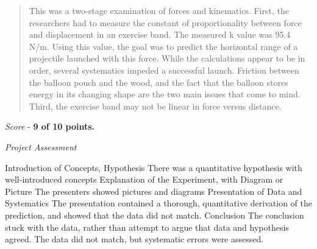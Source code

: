\documentclass[10pt]{article}
\begin{document}
\maketitle

\begin{abstract}
This was a two-stage examination of forces and kinematics.  First, the researchers had to measure the constant of proportionality between force and displacement in an exercise band.  The measured k value was 95.4 N/m.  Using this value, the goal was to predict the horizontal range of a projectile launched with this force.  While the calculations appear to be in order, several systematics impeded a successful launch.  Friction between the balloon pouch and the wood, and the fact that the balloon stores energy in its changing shape are the two main issues that come to mind.  Third, the exercise band may not be linear in force versus distance.
\end{abstract}

\textit{Score} - \textbf{9 of 10 points.}

\textit{Project Assessment}
\begin{outline}[enumerate]
\1 Introduction of Concepts, Hypothesis
\2 There was a quantitative hypothesis with well-introduced concepts
\1 Explanation of the Experiment, with Diagram or Picture
\2 The presenters showed pictures and diagrams
\1 Presentation of Data and Systematics
\2 The presentation contained a thorough, quantitative derivation of the prediction, and showed that the data did not match.
\1 Conclusion
\2 The conclusion stuck with the data, rather than attempt to argue that data and hypothesis agreed.  The data did not match, but systematic errors were assessed.
\end{outline}
\end{document}
